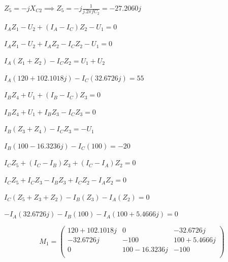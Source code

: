 \documentclass[10pt,a4paper]{article}
\begin{document}
\vspace*{0.1cm}

$Z_{5} = -jX_{C2} \implies Z_{5} = -j \frac{1}{j.2\pi fC_{2}} = -27.2060j $

\vspace*{0.5cm}

$I_{A}Z_{1}-U_{2}+(I_{A}-I_{C})Z_{2}-U_{1}=0$

\vspace*{0.1cm}

$I_{A}Z_{1}-U_{2}+I_{A}Z_{2} - I_{C}Z_{2} - U_{1}=0$

\vspace*{0.1cm}

$I_{A}(Z_{1}+Z_{2}) - I_{C}Z_{2} = U_{1}+U_{2}$

\vspace*{0.1cm}

$I_{A}(120+102.1018j) - I_{C}(32.6726j) = 55$

\vspace*{0.5cm}



$I_{B}Z_{4}+U_{1}+(I_{B}-I_{C})Z_{3}=0$

\vspace*{0.1cm}

$I_{B}Z_{4}+U_{1}+I_{B}Z_{3} - I_{C}Z_{3} =0$

\vspace*{0.1cm}

$I_{B}(Z_{3}+Z_{4}) - I_{C}Z_{3} = -U_{1}$

\vspace*{0.1cm}

$I_{B}(100-16.3236j) - I_{C}(100) =-20$

\vspace*{0.5cm}


$I_{C}Z_{5}+(I_{C}-I_{B})Z_{3}+(I_{C}-I_{A})Z_{2}=0$

\vspace*{0.1cm}

$I_{C}Z_{5}+I_{C}Z_{3}-I_{B}Z_{3}+I_{C}Z_{2}-I_{A}Z_{2}=0$

\vspace*{0.1cm}

$I_{C}(Z_{5}+Z_{3}+Z_{2})-I_{B}(Z_{3})-I_{A}(Z_{2})=0$

\vspace*{0.1cm}

$-I_{A}(32.6726j)-I_{B}(100)-I_{A}(100+5.4666j)=0$

\vspace*{0.5cm}


\[
M_{1}=
\begin{pmatrix}
120+102.1018j & 0 & -32.6726j \\ -32.6726j & -100 & 100+5.4666j \\ 0 & 100-16.3236j & -100 \\
\end{pmatrix}
\]\\
\end{document}
